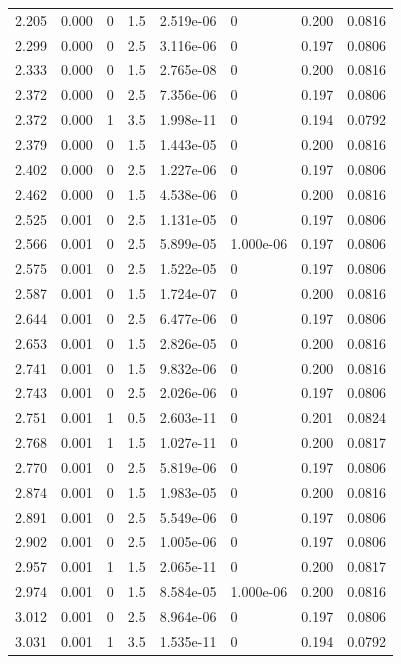 \documentclass[preview]{standalone}
\begin{document}
{{{\begin{tabular}{L{1.2cm}C{1.2cm} C{0.3cm}C{0.5cm} C{1.4cm}C{1.4cm} C{1.4cm}C{1.4cm}}
  2.205  &  0.000  & 0     & 1.5 &  2.519e-06  & 0  & 0.200 &  0.0816   \\ 
  2.299  &  0.000  & 0     & 2.5 &  3.116e-06  & 0  & 0.197 &  0.0806   \\ 
  2.333  &  0.000  & 0     & 1.5 &  2.765e-08  & 0  & 0.200 &  0.0816   \\ 
  2.372  &  0.000  & 0     & 2.5 &  7.356e-06  & 0  & 0.197 &  0.0806   \\ 
  2.372  &  0.000  & 1     & 3.5 &  1.998e-11  & 0  & 0.194 &  0.0792   \\ 
  2.379  &  0.000  & 0     & 1.5 &  1.443e-05  & 0  & 0.200 &  0.0816   \\ 
  2.402  &  0.000  & 0     & 2.5 &  1.227e-06  & 0  & 0.197 &  0.0806   \\ 
  2.462  &  0.000  & 0     & 1.5 &  4.538e-06  & 0  & 0.200 &  0.0816   \\ 
  2.525  &  0.001  & 0     & 2.5 &  1.131e-05  & 0  & 0.197 &  0.0806   \\ 
  2.566  &  0.001  & 0     & 2.5 &  5.899e-05  & 1.000e-06  & 0.197 &  0.0806   \\ 
  2.575  &  0.001  & 0     & 2.5 &  1.522e-05  & 0  & 0.197 &  0.0806   \\ 
  2.587  &  0.001  & 0     & 1.5 &  1.724e-07  & 0  & 0.200 &  0.0816   \\ 
  2.644  &  0.001  & 0     & 2.5 &  6.477e-06  & 0  & 0.197 &  0.0806   \\ 
  2.653  &  0.001  & 0     & 1.5 &  2.826e-05  & 0  & 0.200 &  0.0816   \\ 
  2.741  &  0.001  & 0     & 1.5 &  9.832e-06  & 0  & 0.200 &  0.0816   \\ 
  2.743  &  0.001  & 0     & 2.5 &  2.026e-06  & 0  & 0.197 &  0.0806   \\ 
  2.751  &  0.001  & 1     & 0.5 &  2.603e-11  & 0  & 0.201 &  0.0824   \\ 
  2.768  &  0.001  & 1     & 1.5 &  1.027e-11  & 0  & 0.200 &  0.0817   \\ 
  2.770  &  0.001  & 0     & 2.5 &  5.819e-06  & 0  & 0.197 &  0.0806   \\ 
  2.874  &  0.001  & 0     & 1.5 &  1.983e-05  & 0  & 0.200 &  0.0816   \\ 
  2.891  &  0.001  & 0     & 2.5 &  5.549e-06  & 0  & 0.197 &  0.0806   \\ 
  2.902  &  0.001  & 0     & 2.5 &  1.005e-06  & 0  & 0.197 &  0.0806   \\ 
  2.957  &  0.001  & 1     & 1.5 &  2.065e-11  & 0  & 0.200 &  0.0817   \\ 
  2.974  &  0.001  & 0     & 1.5 &  8.584e-05  & 1.000e-06  & 0.200 &  0.0816   \\ 
  3.012  &  0.001  & 0     & 2.5 &  8.964e-06  & 0  & 0.197 &  0.0806   \\ 
  3.031  &  0.001  & 1     & 3.5 &  1.535e-11  & 0  & 0.194 &  0.0792   \\ 
\hline 
\end{tabular} 

}}}
\end{document}

